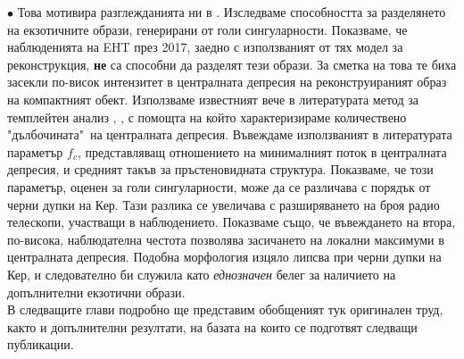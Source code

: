 \noindent$\bullet$ Това мотивира разглежданията ни в \cite{Deliyski2024}. Изследваме способността за разделянето на екзотичните образи, генерирани от голи сингуларности. Показваме, че наблюденията на EHT през 2017, заедно с използваният от тях модел за реконструкция, \textbf{не} са способни да разделят тези образи. За сметка на това те биха засекли по-висок интензитет в централната депресия на реконструираният образ на компактният обект. Използваме известният вече в литературата метод за темплейтен анализ \cite{Eichhorn2022}, \cite{Tiede2022}, с помощта на който характеризираме количествено "дълбочината"$\,$ на централната депресия. Въвеждаме използваният в литературата параметър $f_c$, представляващ отношението на минималният поток в централната депресия, и средният такъв за пръстеновидната структура. Показваме, че този параметър, оценен за голи сингуларности, може да се различава с порядък от черни дупки на Кер. Тази разлика се увеличава с разширяването на броя радио телескопи, участващи в наблюдението. Показваме също, че въвеждането на втора, по-висока, наблюдателна честота позволява засичането на локални максимуми в централната депресия. Подобна морфология изцяло липсва при черни дупки на Кер, и следователно би служила като \emph{еднозначен} белег за наличието на допълнителни екзотични образи.\\\newline
В следващите глави подробно ще представим обобщеният тук оригинален труд, както и допълнителни резултати, на базата на които се подготвят следващи публикации. 
